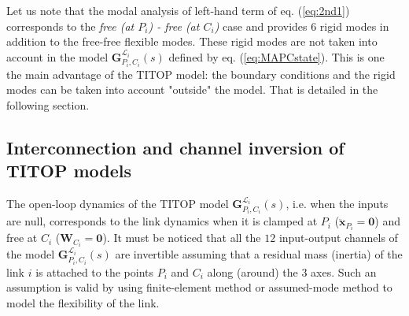  Let us note that the modal analysis of left-hand term of eq. (\ref{eq:2nd1}) corresponds to the \textit{free (at $P_i$) - free (at $C_i$)} case and provides $6$ rigid modes in addition to the free-free flexible modes. These rigid modes are not taken into account in the model $\mathbf{G}_{P_i,C_i}^{\mathcal{L}_i}(s)$ defined by eq. (\ref{eq:MAPCstate}). This is one the main advantage of the TITOP model: the boundary conditions and the rigid modes can be taken into account "outside" the model. That is detailed in the following section.
 
\subsection{Interconnection and channel inversion of TITOP models} 
The open-loop dynamics of the TITOP model $\mathbf{G}_{P_i,C_i}^{\mathcal{L}_i}(s)$, i.e. when the inputs are null, corresponds to the link dynamics when it is clamped at $P_i$ ($\ddot{\mathbf{x}}_{P_i}=\mathbf{0}$) and free at $C_i$ ($\mathbf{W}_{C_i}=\mathbf{0}$). It must be noticed that all the $12$ input-output channels of the model  $\mathbf{G}_{P_i,C_i}^{\mathcal{L}_i}(s)$  are invertible assuming that a residual mass (inertia) of the link $i$ is attached to the points $P_i$ and $C_i$ along (around) the $3$ axes. Such an assumption is valid by using finite-element method or assumed-mode method to  model the flexibility of the link. 

